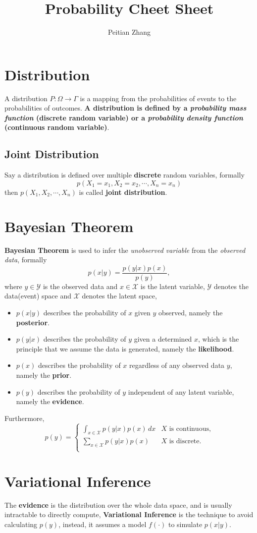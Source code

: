 \documentclass{article}
\title{Probability Cheet Sheet}
\author{Peitian Zhang}
\begin{document}
\maketitle
\tableofcontents
\clearpage
\section{Distribution}
A distribution $P: \Omega\rightarrow\Gamma$ is a mapping from the probabilities of events to the probabilities of outcomes. \textbf{A distribution is defined by a \emph{probability mass function} (discrete random variable) or a \emph{probability density function} (continuous random variable)}.

\subsection{Joint Distribution}
Say a distribution is defined over multiple \textbf{discrete} random variables, formally $$p(X_1=x_1,X_2=x_2,\cdots,X_n=x_n)$$then $p(X_1,X_2,\cdots,X_n)$ is called \textbf{joint distribution}.

\section{Bayesian Theorem}
\textbf{Bayesian Theorem} is used to infer the \emph{unobserved variable} from the \emph{observed data}, formally
\begin{equation}
    p(x|y) = \frac{p(y|x)p(x)}{p(y)},
\end{equation}
where $y\in \mathcal{Y}$ is the observed data and $x\in \mathcal{X}$ is the latent variable, $\mathcal{Y}$ denotes the data(event) space and $\mathcal{X}$ denotes the latent space, \begin{itemize}
    \item $p(x|y)$ describes the probability of $x$ given $y$ observed, namely the \textbf{posterior}.
    \item $p(y|x)$ describes the probability of $y$ given a determined $x$, which is the principle that we assume the data is generated, namely the \textbf{likelihood}.
    \item $p(x)$ describes the probability of $x$ regardless of any observed data $y$, namely the \textbf{prior}.
    \item $p(y)$ describes the probability of $y$ independent of any latent variable, namely the \textbf{evidence}.
\end{itemize}
Furthermore, \begin{equation}
    p(y) = \begin{cases}
        \int_{x\in \mathcal{X}} p(y|x)p(x) \,dx&X \text{ is continuous,}\\
        \sum_{x\in\mathcal{X}} p(y|x)p(x) &X \text{ is discrete.}\\
    \end{cases}
\end{equation}
\section{Variational Inference}
The \textbf{evidence} is the distribution over the whole data space, and is usually intractable to directly compute, \textbf{Variational Inference} is the technique to avoid calculating $p(y)$, instead, it assumes a model $f(\cdot)$ to simulate $p(x|y)$.
\end{document}
